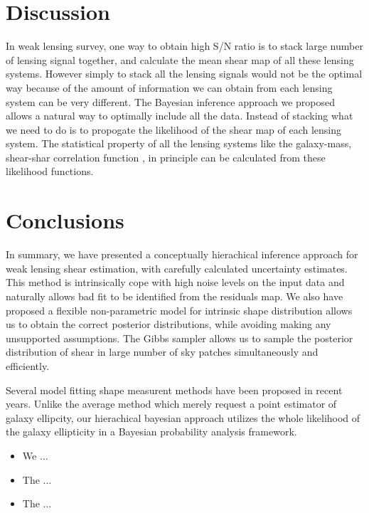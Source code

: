 \documentclass[useAMS,usenatbib]{mn2e}
\begin{document}



\section{Discussion}

\label{sec:XXX} In weak lensing survey, one way to obtain high S/N
ratio is to stack large number of lensing signal together, and calculate
the mean shear map of all these lensing systems. However simply to
stack all the lensing signals would not be the optimal way because
of the amount of information we can obtain from each lensing system
can be very different. The Bayesian inference approach we proposed
allows a natural way to optimally include all the data. Instead of
stacking what we need to do is to propogate the likelihood of the
shear map of each lensing system. The statistical property of all
the lensing systems like the galaxy-mass, shear-shar correlation function
, in principle can be calculated from these likelihood functions.






\section{Conclusions}

\label{sec:conclusions}

In summary, we have presented a conceptually hierachical inference
approach for weak lensing shear estimation, with carefully calculated 
uncertainty estimates. This method is intrinsically cope with high noise
levels on the input data and naturally allows bad fit to be identified 
from the residuals map. We also have proposed a flexible non-parametric model 
for intrinsic shape distribution allows us to obtain the correct posterior 
distributions, while avoiding making any unsupported assumptions. The Gibbs
sampler allows us to sample the posterior distribution of shear in large number of
sky patches simultaneously and efficiently.

Several  model fitting  shape measurent methods have been proposed in recent years.
Unlike the average method which merely request a point estimator of galaxy ellipcity, our 
hierachical bayesian approach utilizes the whole likelihood of the galaxy ellipticity in a Bayesian probability analysis framework.
\begin{itemize}
\item We ...
\item The ...
\item The ...
\end{itemize}
\end{document}
